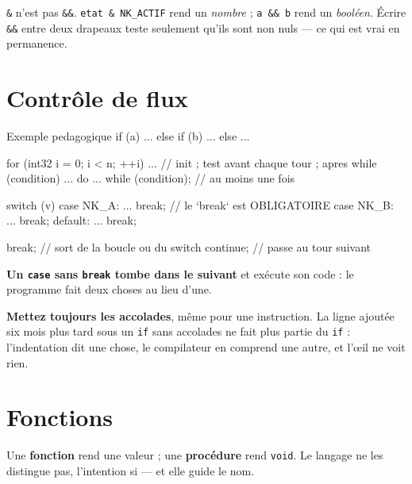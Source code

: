 \begin{nkpiege}
\texttt{\&} n'est pas \texttt{\&\&}. \texttt{etat \& NK\_ACTIF} rend un
\emph{nombre} ; \texttt{a \&\& b} rend un \emph{booléen}. Écrire \texttt{\&\&}
entre deux drapeaux teste seulement qu'ils sont non nuls --- ce qui est vrai en
permanence.
\end{nkpiege}

\section{Contrôle de flux}

\begin{nkcode}{Exemple pedagogique}
if (a) { ... } else if (b) { ... } else { ... }

for (int32 i = 0; i < n; ++i) { ... }   // init ; test avant chaque tour ; apres
while (condition)             { ... }
do { ... } while (condition);           // au moins une fois

switch (v) {
    case NK_A: ... break;               // le `break` est OBLIGATOIRE
    case NK_B: ... break;
    default:   ... break;
}

break;      // sort de la boucle ou du switch
continue;   // passe au tour suivant
\end{nkcode}

\begin{nkpiege}
\textbf{Un \texttt{case} sans \texttt{break} tombe dans le suivant} et exécute
son code : le programme fait deux choses au lieu d'une.

\textbf{Mettez toujours les accolades}, même pour une instruction. La ligne
ajoutée six mois plus tard sous un \texttt{if} sans accolades ne fait plus partie
du \texttt{if} : l'indentation dit une chose, le compilateur en comprend une
autre, et l'\oe il ne voit rien.
\end{nkpiege}

\section{Fonctions}

Une \textbf{fonction} rend une valeur ; une \textbf{procédure} rend
\texttt{void}. Le langage ne les distingue pas, l'intention si --- et elle guide
le nom.


